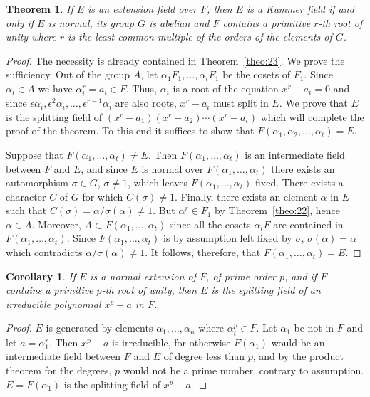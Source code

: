 \documentclass[10pt,leqno,a5paper]{book}
\newtheorem{theo}{Theorem}
\newtheorem*{coro*}{Corollary}
\theoremstyle{definition}
\begin{document}
\begin{theo}
\label{theo:25}
If $E$ is an extension field over $F$, then $E$ is a Kummer field if and only if $E$ is normal, its group $G$ is abelian and $F$ contains a primitive $r$-th root of unity where $r$ is the least common multiple of the orders of the elements of $G$.
\end{theo}


\begin{proof}
The necessity is already contained in Theorem~\ref{theo:23}.
We prove the sufficiency.
Out of the group $A$, let $\alpha_1 F_1, \ldots, \alpha_t F_1$ be the cosets of $F_1$.
Since $\alpha_i \in A$ we have $\alpha_i^r = a_i \in F$.
Thus, $\alpha_i$ is a root of the equation $x^r - a_i = 0$ and since $\epsilon \alpha_i, \epsilon^2 \alpha_i, \ldots, \epsilon^{r-1} \alpha_i$ are also roots, $x^r - a_i$ must split in $E$.
We prove that $E$ is the splitting field of $(x^r - a_1) (x^r - a_2) \cdots (x^r - a_t)$ which will complete the proof of the theorem.
To this end it suffices to show that $F(\alpha_1, \alpha_2, \ldots, \alpha_t) = E$.

Suppose that $F(\alpha_1, \ldots, \alpha_t) \not= E$.
Then $F(\alpha_1, \ldots, \alpha_t)$ is an intermediate field between $F$ and $E$, and since $E$ is normal over $F(\alpha_1, \ldots, \alpha_t)$ there exists an automorphism $\sigma \in G$, $\sigma \not= 1$, which leaves $F(\alpha_1, \ldots, \alpha_t)$ fixed.
There exists a character $C$ of $G$ for which $C(\sigma) \not= 1$.
Finally, there exists an element $\alpha$ in $E$ such that $C(\sigma) = \alpha / \sigma(\alpha) \not= 1$.
But $\alpha^r \in F_1$ by Theorem~\ref{theo:22}, hence $\alpha \in A$.
Moreover, $A \subset F(\alpha_1, \ldots, \alpha_t)$ since all the cosets $\alpha_i F$ are contained in $F(\alpha_1, \ldots, \alpha_t)$.
Since $F(\alpha_1, \ldots, \alpha_t)$ is by assumption left fixed by $\sigma$, $\sigma(\alpha) = \alpha$ which contradicts $\alpha / \sigma(\alpha) \not= 1$.
It follows, therefore, that $F(\alpha_1, \ldots, \alpha_t) = E$.
\end{proof}


\begin{coro*}
If $E$ is a normal extension of $F$, of prime order $p$, and if $F$ contains a primitive $p$-th root of unity, then $E$ is the splitting field of an irreducible polynomial $x^p - a$ in $F$.
\end{coro*}

\begin{proof}
$E$ is generated by elements $\alpha_1, \ldots, \alpha_n$ where $\alpha_i^p \in F$.
Let $\alpha_1$ be not in $F$ and let $a = \alpha_1^r$.
Then $x^p - a$ is irreducible, for otherwise $F(\alpha_1)$ would be an intermediate field between $F$ and $E$ of degree less than $p$, and by the product theorem for the degrees, $p$ would not be a prime number, contrary to assumption.
$E = F(\alpha_1)$ is the splitting field of $x^p - a$.
\end{proof}
\end{document}
